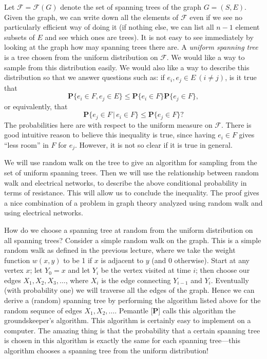 \documentclass{stml-l}
\theoremstyle{definition}
\numberwithin{equation}{chapter}
\numberwithin{figure}{chapter}
\numberwithin{figure}{section}
\begin{document}
Let $\mathcal{F}=\mathcal{F}(G)$ denote the set of spanning trees of
the graph $G=(S,E)$. Given the graph, we can write down all the
elements of $\mathcal{F}$ even if we see no particularly efficient
way of doing it (if nothing else, we can list all $n-1$ element
subsets of $E$ and see which ones are trees). It is not easy to see
immediately by looking at the graph how may spanning trees there
are. A \emph{uniform spanning tree} is a tree chosen from the
uniform distribution on $\mathcal{F}$. We would like a way to sample
from this distribution easily. We would also like a way to describe
this distribution so that we answer questions such as: if
$e_{i},e_{j}\in E\ (i\neq j)$, is it true that
\begin{equation*}
\mathbf{P}\{e_{i}\in F,e_{j}\in E\}\leq \mathbf{P}\{e_{i}\in F\}\mathbf{P}\{e_{j}\in F\},
\end{equation*}
or equivalently, that
\begin{equation}
\label{ch10:eqn10.1}\mathbf{P}\{e_{j}\in F\,|\,e_{i}\in F\}\leq
\mathbf{P}\{e_{j}\in F\}?
\end{equation}
The probabilities here are with respect to the uniform measure on
$\mathcal{F}$. There is good intuitive reason to believe this
inequality is true, since having $e_{i}\in F$ gives ``less room'' in
$F$ for $e_{j}$. However, it is not so clear if it is true in
general.

We will use random walk on the tree to give an algorithm for
sampling from the set of uniform spanning trees. Then we will use
the relationship between random walk and electrical networks, to
describe the above conditional probability in terms of resistance.
This will allow us to conclude the inequality. The proof gives a
nice combination of a problem in graph theory analyzed using random
walk and using electrical networks.

How do we choose a spanning tree at random from the uniform
distribution on all spanning trees? Consider a simple random walk on
the graph. This is a simple random walk as defined in the previous
lecture, where we take the weight function $w(x,y)$ to be 1 if $x$
is adjacent to $y$ (and $0$ otherwise). Start at any vertex $x$; let
$Y_{0}=x$ and let $Y_{i}$ be the vertex visited at time $i$; then
choose our edges $X_{1},X_{2},X_{3},\ldots$, where $X_{i}$ is the
edge connecting $Y_{i-1}$ and $Y_{i}$. Eventually (with probability
one) we will traverse all the edges of the graph. Hence we can
derive a (random) spanning tree by performing the algorithm listed
above for the random sequnce of edges $X_{1},X_{2},\ldots$. Pemantle
[\textbf{P}] calls this algorithm the groundskeeper's algorithm.
This algorithm is certainly easy to implement on a computer. The
amazing thing is that the probability that a certain spanning tree
is chosen in this algorithm is exactly the same for each spanning
tree---this algorithm chooses a spanning tree from the uniform
distribution!
\end{document}
